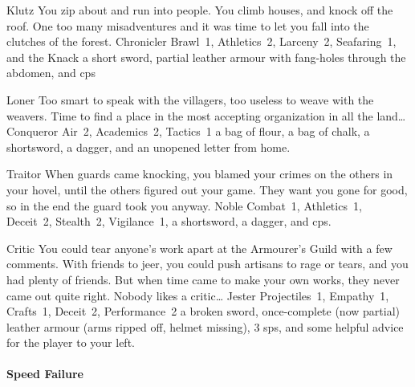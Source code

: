 \begin{multicols}{2}
\begin{itemize}
    {Klutz}%
    {
      You zip about and run into people.
      You climb houses, and knock off the roof.
      One too many misadventures and it was time to let you fall into the clutches of the forest.
    }%
    {Chronicler}%
    {Brawl~1, Athletics~2, Larceny~2, Seafaring~1, and the Knack \charge}%
    {a short sword, partial leather armour with fang-holes through the abdomen, and  \glspl{cp}}%

    {Loner}%
    {
      Too smart to speak with the villagers, too useless to weave with the weavers.
      Time to find a place in the most accepting organization in all the land\ldots
    }%
    {Conqueror}%
    {
      Air~2, Academics~2, Tactics~1
    }%
    {a bag of flour, a bag of chalk, a shortsword, a dagger, and an unopened letter from home.}%

    {Traitor}%
    {
      When guards came knocking, you blamed your crimes on the others in your hovel, until the others figured out your game.
      They want you gone for good, so in the end the \gls{guard} took you anyway.
    }%
    {Noble}%
    {
      Combat~1, Athletics~1, Deceit~2, Stealth~2, Vigilance~1,
    }%
    {a shortsword, a dagger, and  \glspl{cp}.}%

    {Critic}%
    {
      You could tear anyone's work apart at the Armourer's Guild with a few comments.
      With friends to jeer, you could push artisans to rage or tears, and you had plenty of friends.
      But when time came to make your own works, they never came out quite right.
      Nobody likes a critic\ldots
    }%
    {Jester}%
    {
      Projectiles~1, Empathy~1, Crafts~1, Deceit~2, Performance~2
    }%
    {a broken sword, once-complete (now partial) leather armour (arms ripped off, helmet missing), 3 \glspl{sp}, and some helpful advice for the player to your left.}%

\end{itemize}

\paragraph{Speed Failure}

\begin{itemize}


\end{itemize}
\end{multicols}
